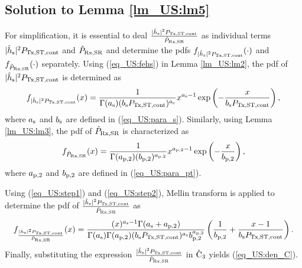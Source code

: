 \subsection{Solution to Lemma \ref{lm_US:lm5}} \label{ap:one}
\begin{IEEEproof}[Solution]
For simplification, it is essential to deal $\frac{|\hat{h}_{\text{s}}|^2 P_{\text{Tx,ST,cont}}}{\hat{P}_{\text{Rx,SR}}}$ as individual terms $|\hat{h}_{\text{s}}|^2 P_{\text{Tx,ST,cont}}$ and $\hat{P}_{\text{Rx,SR}}$ and determine the pdfs $f_{|\hat{h}_{\text{s}}|^2 P_{\text{Tx,ST,cont}}}(\cdot)$ and $f_{\hat{P}_{\text{Rx,SR}}}(\cdot)$ separately.
Using (\ref{eq_US:fehs}) in Lemma \ref{lm_US:lm2}, the pdf of $|\hat{h}_{\text{s}}|^2 P_{\text{Tx,ST,cont}}$ is determined as
\begin{align}
f_{|\hat{h}_{\text{s}}|^2 P_{\text{Tx,ST,cont}}}(x) = \frac{1}{\Gamma(a_{\text{s}}) (b_{\text{s}} P_{\text{Tx,ST,cont}})^{a_{\text{s}}}} x^{a_{\text{s}} - 1} \exp\left( - \frac{x}{ b_{\text{s}} P_{\text{Tx,ST,cont}}} \right), \label{eq_US:step1} 
\end{align}
where $a_{\text{s}}$ and $b_{\text{s}}$ are defined in (\ref{eq_US:para_s}).
Similarly, using Lemma \ref{lm_US:lm3}, the pdf of $\hat{P}_{\text{Rx,SR}}$ is characterized as
\begin{align}
f_{\hat{P}_{\text{Rx,SR}}}(x) = \frac{1}{\Gamma(a_{\text{p,2}}) (b_{\text{p,2}})^{a_{\text{p,2}}}} x^{a_{\text{p,2}} - 1} \exp\left( - \frac{x}{ b_{\text{p,2}}} \right), \label{eq_US:step2} 
\end{align}
where $a_{\text{p,2}}$ and $b_{\text{p,2}}$ are defined in (\ref{eq_US:para_pt}).

Using (\ref{eq_US:step1}) and (\ref{eq_US:step2}), Mellin transform \cite{NIST} is applied to determine the pdf of $\frac{|\hat{h}_{\text{s}}|^2 P_{\text{Tx,ST,cont}}}{\hat{P}_{\text{Rx,SR}}}$ as
\begin{align}
f_{\frac{|\hat{h}_{\text{s}}|^2 P_{\text{Tx,ST,cont}}}{\hat{P}_{\text{Rx,SR}}}}(x) = \frac{(x)^{a_{\text{s}} - 1} \Gamma(a_{\text{s}} + a_{\text{p,2}})}{\Gamma(a_{\text{s}}) \Gamma(a_{\text{p,2}}) (b_{\text{s}} P_{\text{Tx,ST,cont}}) ^{a_{\text{s}}} b_{\text{p,2}}^{a_{\text{p,2}}}} \left(\frac{1}{b_{\text{p,2}}} + \frac{x - 1}{b_{\text{s}} P_{\text{Tx,ST,cont}}}\right).
\end{align}
Finally, substituting the expression $\frac{|\hat{h}_{\text{s}}|^2 P_{\text{Tx,ST,cont}}}{\hat{P}_{\text{Rx,SR}}}$ in $\hat{\text{{C}}}_{\text{3}}$ yields (\ref{eq_US:den_C}).
\end{IEEEproof}
